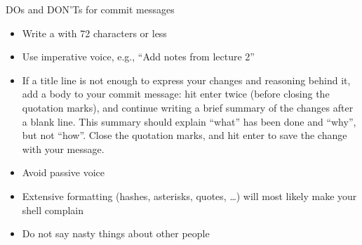 \ignorespaces \begin{findoutmore}[label={fom-commit-message-guidance}, before title={\thetcbcounter\ }, float, floatplacement=tb, check odd page=true]{DOs and DON’Ts for commit messages}
\label{\detokenize{basics/101-102-populate:fom-commit-message-guidance}}

\sphinxAtStartPar
{}
\begin{itemize}
\item {} 
\sphinxAtStartPar
Write a  with 72 characters or less

\item {} 
\sphinxAtStartPar
Use imperative voice, e.g., “Add notes from lecture 2”

\item {} 
\sphinxAtStartPar
If a title line is not enough to express your changes and reasoning behind it, add a body to your commit message: hit enter twice (before closing the quotation marks), and continue writing a brief summary of the changes after a blank line. This summary should explain “what” has been done and “why”, but not “how”. Close the quotation marks, and hit enter to save the change with your message.

\end{itemize}

\sphinxAtStartPar
{}
\begin{itemize}
\item {} 
\sphinxAtStartPar
Avoid passive voice

\item {} 
\sphinxAtStartPar
Extensive formatting (hashes, asterisks, quotes, …) will most likely make your shell complain

\item {} 
\sphinxAtStartPar
Do not say nasty things about other people

\end{itemize}


\end{findoutmore}

